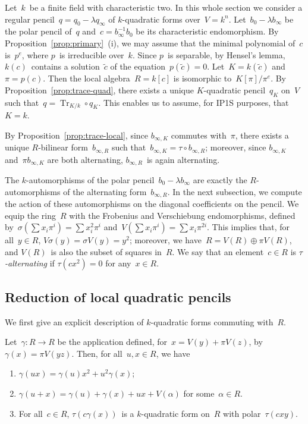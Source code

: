\documentclass{lms}
\DeclareMathOperator\Tr{Tr}
\begin{document}
Let~$k$~be a finite field with characteristic two.
In this whole section we consider a regular pencil~$q = q_0 - λ q_{∞}$
of $k$-quadratic forms over~$V = k^n$.
Let~$b_0 - λ b_∞$ be the polar pencil of~$q$
and~$c = b_∞^{-1} b_0^{}$ be its characteristic endomorphism.
By Proposition~\ref{prop:primary}~(i),
we may assume that the minimal polynomial of~$c$ is~$p^e$,
where $p$~is irreducible over~$k$.
Since $p$~is separable, by Hensel's lemma,
$k(c)$~contains a solution~$\tilde c$
of the equation~$p(\tilde c) = 0$.
Let~$K = k(\tilde c)$ and~$π = p(c)$.
Then the local algebra~$R = k[c]$ is isomorphic to~$K[π]/π^e$.
By Proposition~\ref{prop:trace-quad},
there exists a unique $K$-quadratic pencil~$q_K$ on~$V$
such that~$q = \Tr_{K/k} ∘ q_K$.
This enables us to assume, for IP1S purposes, that $K=k$.

By Proposition~\ref{prop:trace-local}, since $b_{∞,K}$ commutes with~$π$,
there exists a unique $R$-bilinear form~$b_{∞, R}$
such that~$b_{∞,K} = τ ∘ b_{∞, R}$;
moreover, since $b_{∞,K}$ and~$π b_{∞, K}$ are both alternating,
$b_{∞, R}$~is again alternating.

The $k$-automorphisms of the polar pencil~$b_0 - λ b_{∞}$
are exactly the $R$-automorphisms of the alternating form~$b_{∞,R}$.
In the next subsection,
we compute the action of these automorphisms
on the diagonal coefficients on the pencil.
We equip the ring~$R$ with the Frobenius and Verschiebung endomorphisms,
defined by~$σ(∑ x_i π^i) = ∑ x_i^2 π^i$ and~$V(∑ x_i π^i) = ∑ x_i π^{2i}$.
This implies that, for all~$y ∈ R$, $V σ(y) = σ V(y) = y^2$;
moreover, we have~$R = V(R) ⊕ π V(R)$,
and $V(R)$~is also the subset of squares in~$R$.
We say that an element~$c ∈ R$
is \emph{$τ$-alternating} if $τ(c x^2) = 0$ for any~$x ∈ R$.

\subsection{Reduction of local quadratic pencils}

We first give an explicit description of $k$-quadratic forms commuting
with~$R$.

\begin{lem}\label{lem:gamma-polar}
Let~$γ: R → R$ be the application defined, for~$x = V(y) + π V(z)$,
by~$γ(x) = π V(yz)$. Then, for all~$u, x ∈ R$, we have
\begin{enumerate}
\item $γ(ux) = γ(u) x^2 + u^2 γ(x)$;
\item $γ(u+x) = γ(u) + γ(x) + ux + V(α)$ for some~$α ∈ R$.
\item For all~$c ∈ R$, $τ(c γ (x))$~is a $k$-quadratic form on~$R$
with polar~$τ(c x y)$.
\end{enumerate}
\end{lem}
\end{document}
